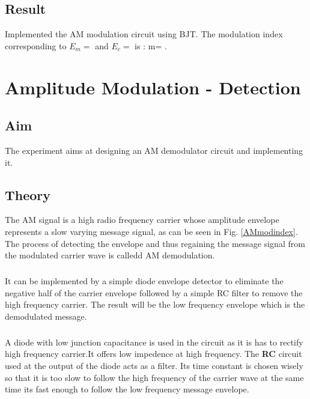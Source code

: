 \documentclass{book}
\begin{document}
\section*{Result}

Implemented the AM modulation circuit using BJT.
The modulation index corresponding to $E_m=$ \textemdash \textemdash and $E_c=$ \textemdash\textemdash is : m= \textemdash\textemdash .






\chapter[Amplitude Modulation - Detection]{Amplitude Modulation - Detection}

\section*{Aim}
The experiment aims at designing an AM demodulator circuit and implementing it.

\section*{Theory}
The AM signal is a high radio frequency carrier whose amplitude envelope represents a slow varying message signal, as can be seen in Fig. \ref{AMmodindex}. The process of detecting the envelope and thus regaining the message signal from the modulated carrier wave is calledd AM demodulation.
\paragraph{}
It can be implemented by a simple diode envelope detector to eliminate the negative half of the carrier envelope followed by a simple RC filter to remove the high frequency carrier. The result will be the low frequency envelope which is the demodulated message.
\paragraph{}
A diode with low junction capacitance is used in the circuit as it is has to rectify high frequency carrier.It offers low impedence at high frequency. The \textbf{RC} circuit used at the output of the diode acts as a filter. Its time constant is chosen wisely so that it is too slow to follow the high frequency of the carrier wave at the same time its fast enough to follow the low frequency message envelope. 
\end{document}
